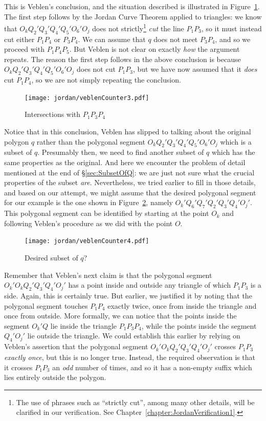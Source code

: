 This is Veblen's conclusion, and the situation described is illustrated in Figure~\ref{fig:VeblenCounter3}. The first step follows by the Jordan Curve Theorem applied to triangles: we know that $O_kQ_2'Q_3'Q_4'Q_5'O_6'O_j$ does not strictly\footnote{The use of phrases such as ``strictly cut'', among many other details, will be clarified in our verification. See Chapter~\ref{chapter:JordanVerification1}.} \emph{cut} the line $P_1P_3$, so it must instead cut either $P_1P_4$ or $P_3P_4$. We can assume that $q$ does not meet $P_3P_4$, and so we proceed with $P_1P_4P_5$. But Veblen is not clear on exactly \emph{how} the argument repeats. The reason the first step follows in the above conclusion is because $O_kQ_2'Q_3'Q_4'Q_5'O_6'O_j$ does not cut $P_1P_3$, but we have now assumed that it \emph{does} cut $P_1P_4$, so we are not simply repeating the conclusion. 

\begin{figure}
\centering
\texttt{[image: jordan/veblenCounter3.pdf]}
\caption{Intersections with $P_1P_3P_4$}
\label{fig:VeblenCounter3}
\end{figure}

Notice that in this conclusion, Veblen has slipped to talking about the original polygon $q$ rather than the polygonal segment $O_kQ_2'Q_3'Q_4'Q_5'O_6'O_j$ which is a subset of $q$. Presumably then, we need to find another subset of $q$ which has the same properties as the original. And here we encounter the problem of detail mentioned at the end of \S\ref{sec:SubsetOfQ}: we are just not sure what the crucial properties of the subset \emph{are}. Nevertheless, we tried earlier to fill in those details, and based on our attempt, we might assume that the desired polygonal segment for our example is the one shown in Figure~\ref{fig:VeblenCounter4}, namely $O_k'Q_6'Q_7'Q_2'Q_3'Q_4'O_j'$. This polygonal segment can be identified by starting at the point $O_k$ and following Veblen's procedure as we did with the point $O$. 

\begin{figure}
\centering
\texttt{[image: jordan/veblenCounter4.pdf]}
\caption{Desired subset of $q$?}
\label{fig:VeblenCounter4}
\end{figure}

Remember that Veblen's next claim is that the polygonal segment $O_k'O_kQ_2'Q_3'Q_4'O_j'$ has a point inside and outside any triangle of which $P_1P_3$ is a side. Again, this is certainly true. But earlier, we justified it by noting that the polygonal segment touches $P_1P_4$ exactly twice, once from inside the triangle and once from outside. More formally, we can notice that the points inside the segment $O_k'Q$ lie inside the triangle $P_1P_3P_4$, while the points inside the segment $Q_4'O_j'$ lie outside the triangle. We could establish this earlier by relying on Veblen's assertion that the polygonal segment $O_k'O_kQ_2'Q_3'Q_4'O_j'$ crosses $P_1P_3$ \emph{exactly once}, but this is no longer true. Instead, the required observation is that it crosses $P_1P_3$ an \emph{odd} number of times, and so it has a non-empty suffix which lies entirely outside the polygon. 

